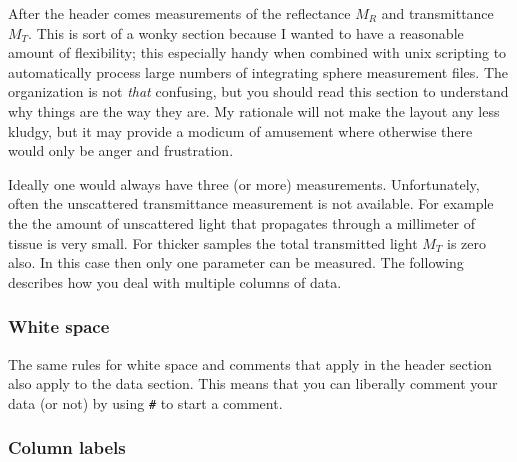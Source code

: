 \documentclass{article}
\begin{document}
After the header comes measurements of the reflectance $M_R$ and transmittance $M_T$.  
This is sort of a wonky section because I wanted to have a reasonable amount of flexibility;
this especially handy when combined with unix scripting to automatically process large numbers 
of integrating sphere measurement files.  The organization is not \textit{that} confusing, but 
you should read this section to understand why things are the way they are.  My rationale will 
not make the layout any less kludgy, but it may provide a modicum of
amusement where otherwise there would only be anger and frustration.

Ideally one
would always have three (or more) measurements.  Unfortunately, often the unscattered
transmittance measurement is not available.  For example the the amount of unscattered
light that propagates through a millimeter of tissue is very small.  For thicker samples
the total transmitted light 
$M_T$ is zero also. In this case then only one parameter can be measured.  The following
describes how you deal with multiple columns of data.

\subsubsection{White space}

The same rules for white space and comments that apply in the header section
also apply to the data section.  This means that you can liberally comment your
data (or not) by using \texttt{\#} to start a comment.

\subsubsection{Column labels}
\label{columnlabels}
\end{document}
